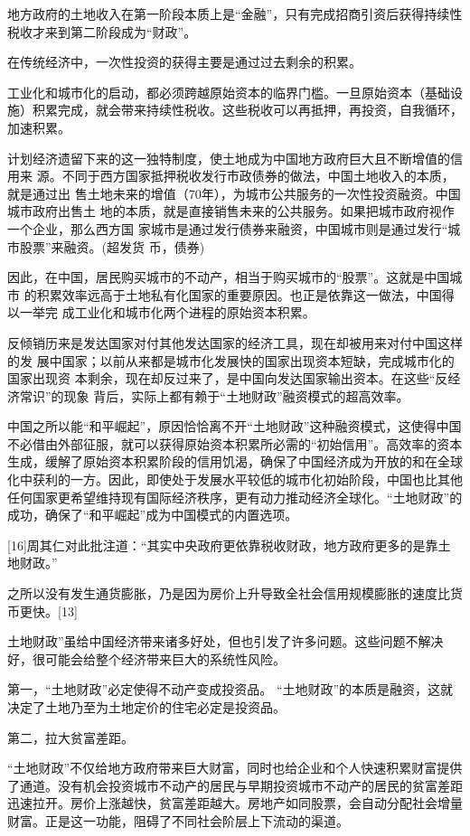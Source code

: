 地方政府的土地收入在第一阶段本质上是“金融”，只有完成招商引资后获得持续性税收才来到第二阶段成为“财政”。

在传统经济中，一次性投资的获得主要是通过过去剩余的积累。

工业化和城市化的启动，都必须跨越原始资本的临界门槛。一旦原始资本（基础设施）积累完成，就会带来持续性税收。这些税收可以再抵押，再投资，自我循环，加速积累。

计划经济遗留下来的这一独特制度，使土地成为中国地方政府巨大且不断增值的信用来
源。不同于西方国家抵押税收发行市政债券的做法，中国土地收入的本质，就是通过出
售土地未来的增值（70年），为城市公共服务的一次性投资融资。中国城市政府出售土
地的本质，就是直接销售未来的公共服务。如果把城市政府视作一个企业，那么西方国
家城市是通过发行债券来融资，中国城市则是通过发行“城市股票”来融资。(超发货
币，债券)

因此，在中国，居民购买城市的不动产，相当于购买城市的“股票”。这就是中国城市
的积累效率远高于土地私有化国家的重要原因。也正是依靠这一做法，中国得以一举完
成工业化和城市化两个进程的原始资本积累。

反倾销历来是发达国家对付其他发达国家的经济工具，现在却被用来对付中国这样的发
展中国家；以前从来都是城市化发展快的国家出现资本短缺，完成城市化的国家出现资
本剩余，现在却反过来了，是中国向发达国家输出资本。在这些“反经济常识”的现象
背后，实际上都有赖于“土地财政”融资模式的超高效率。

中国之所以能“和平崛起”，原因恰恰离不开“土地财政”这种融资模式，这使得中国不必借由外部征服，就可以获得原始资本积累所必需的“初始信用”。高效率的资本生成，缓解了原始资本积累阶段的信用饥渴，确保了中国经济成为开放的和在全球化中获利的一方。因此，即使处于发展水平较低的城市化初始阶段，中国也比其他任何国家更希望维持现有国际经济秩序，更有动力推动经济全球化。“土地财政”的成功，确保了“和平崛起”成为中国模式的内置选项。

[16]周其仁对此批注道：“其实中央政府更依靠税收财政，地方政府更多的是靠土地财政。”

之所以没有发生通货膨胀，乃是因为房价上升导致全社会信用规模膨胀的速度比货币更快。[13]

土地财政”虽给中国经济带来诸多好处，但也引发了许多问题。这些问题不解决好，很可能会给整个经济带来巨大的系统性风险。

第一，“土地财政”必定使得不动产变成投资品。
“土地财政”的本质是融资，这就决定了土地乃至为土地定价的住宅必定是投资品。

第二，拉大贫富差距。

“土地财政”不仅给地方政府带来巨大财富，同时也给企业和个人快速积累财富提供了通道。没有机会投资城市不动产的居民与早期投资城市不动产的居民的贫富差距迅速拉开。房价上涨越快，贫富差距越大。房地产如同股票，会自动分配社会增量财富。正是这一功能，阻碍了不同社会阶层上下流动的渠道。


